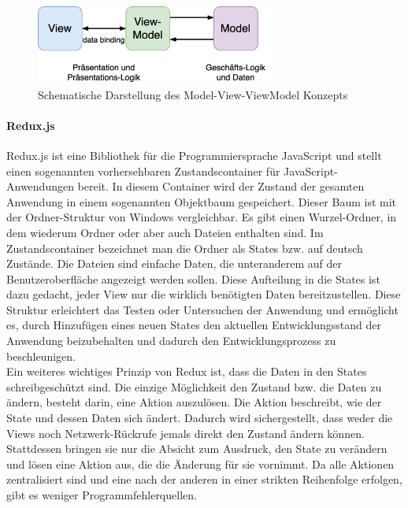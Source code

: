 \documentclass[notables, nomenclature, oneside, 150]{HSMW-Thesis}
\begin{document}
			\begin{figure}[th]
    			\centering
    			\includegraphics[width=0.7\textwidth]{img/mvvm}
    			\caption{Schematische Darstellung des Model-View-ViewModel Konzepts}
    			\label{fig:mvvm}
    		\end{figure}

		\paragraph*{Redux.js}
			Redux.js ist eine Bibliothek für die Programmiersprache JavaScript und stellt einen sogenannten vorhersehbaren Zustandscontainer für JavaScript-Anwendungen bereit. In diesem Container wird der Zustand der gesamten Anwendung in einem sogenannten Objektbaum gespeichert. Dieser Baum ist mit der Ordner-Struktur von Windows vergleichbar. Es gibt einen Wurzel-Ordner, in dem wiederum Ordner oder aber auch Dateien enthalten sind. Im Zustandscontainer bezeichnet man die Ordner als States bzw. auf deutsch Zustände. Die Dateien sind einfache Daten, die unteranderem auf der Benutzeroberfläche angezeigt werden sollen. Diese Aufteilung in die States ist dazu gedacht, jeder View nur die wirklich benötigten Daten bereitzustellen. Diese Struktur erleichtert das Testen oder Untersuchen der Anwendung und ermöglicht es, durch Hinzufügen eines neuen States den aktuellen Entwicklungsstand der Anwendung beizubehalten und dadurch den Entwicklungsprozess zu beschleunigen. \\
			Ein weiteres wichtiges Prinzip von Redux ist, dass die Daten in den States schreibgeschützt sind. Die einzige Möglichkeit den Zustand bzw. die Daten zu ändern, besteht darin, eine Aktion auszulösen. Die Aktion beschreibt, wie der State und dessen Daten sich ändert. Dadurch wird sichergestellt, dass weder die Views noch Netzwerk-Rückrufe jemals direkt den Zustand ändern können. Stattdessen bringen sie nur die Absicht zum Ausdruck, den State zu verändern und lösen eine Aktion aus, die die Änderung für sie vornimmt. Da alle Aktionen zentralisiert sind und eine nach der anderen in einer strikten Reihenfolge erfolgen, gibt es weniger Programmfehlerquellen.
\end{document}
